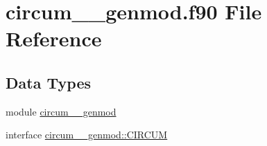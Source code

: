 \hypertarget{circum____genmod_8f90}{\section{circum\+\_\+\+\_\+genmod.\+f90 File Reference}
\label{circum____genmod_8f90}
}
\subsection*{Data Types}
\begin{DoxyCompactItemize}
\item 
module \hyperlink{classcircum____genmod}{circum\+\_\+\+\_\+genmod}
\item 
interface \hyperlink{interfacecircum____genmod_1_1CIRCUM}{circum\+\_\+\+\_\+genmod\+::\+C\+I\+R\+C\+U\+M}
\end{DoxyCompactItemize}
